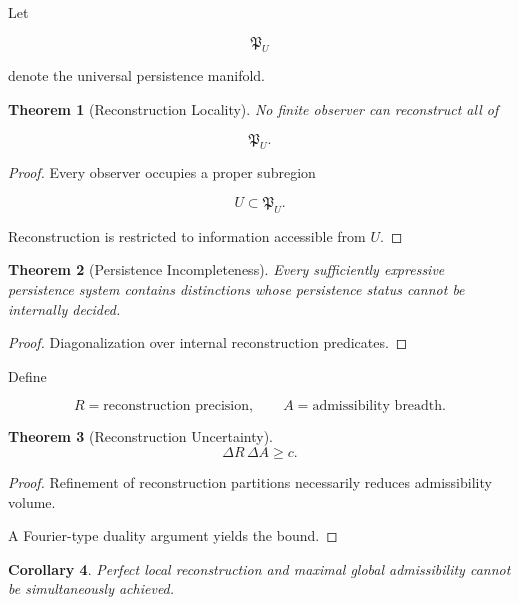\documentclass[12pt,oneside]{article}
\newtheorem{theorem}{Theorem}[section] \newtheorem{lemma}[theorem]{Lemma} \newtheorem{proposition}[theorem]{Proposition} \newtheorem{corollary}[theorem]{Corollary}
\theoremstyle{definition}
\begin{document}
Let

\[
\mathfrak P_U
\]

denote the universal persistence manifold.

\begin{theorem}[Reconstruction Locality]

No finite observer can reconstruct all of

\[
\mathfrak P_U.
\]

\end{theorem}

\begin{proof}

Every observer occupies a proper subregion

\[
U
\subset
\mathfrak P_U.
\]

Reconstruction is restricted to information accessible from \(U\).

\end{proof}

\begin{theorem}[Persistence Incompleteness]

Every sufficiently expressive persistence system contains distinctions whose persistence status cannot be internally decided.

\end{theorem}

\begin{proof}

Diagonalization over internal reconstruction predicates.

\end{proof}

Define

\[
R
=
\text{reconstruction precision},
\qquad
A
=
\text{admissibility breadth}.
\]

\begin{theorem}[Reconstruction Uncertainty]

\[
\Delta R
\,
\Delta A
\ge
c.
\]

\end{theorem}

\begin{proof}

Refinement of reconstruction partitions necessarily reduces admissibility volume.

A Fourier-type duality argument yields the bound.

\end{proof}

\begin{corollary}

Perfect local reconstruction and maximal global admissibility cannot be simultaneously achieved.

\end{corollary}
\end{document}
